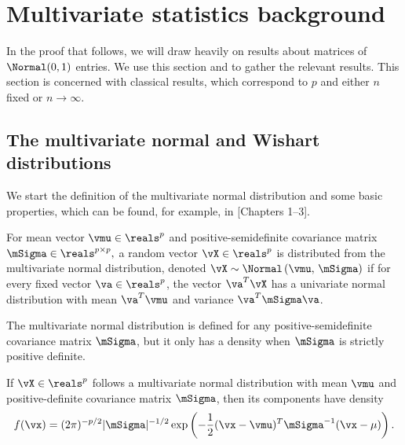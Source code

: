 
\chapter{Multivariate statistics background}

In the proof that follows, we will draw heavily on results about matrices of \iid $\Normal(0,1)$ entries. We use this section and to gather the relevant results. This section is concerned with classical results, which correspond to $p$ and either $n$ fixed or $n\to\infty$.

\section{The multivariate normal and Wishart distributions}

We start the definition of the multivariate normal distribution and some basic properties, which can be found, for example, in \cite{muirhead1982ams}[Chapters 1--3].

\begin{definition}
    \label{D:multivariate-normal}
For mean vector 
\(
    \vmu \in \reals^p
\)
and positive-semidefinite covariance matrix
\(
    \mSigma \in \reals^{p\times p},
\)
a random vector 
\(
    \vX \in \reals^p
\)
is distributed from the multivariate normal distribution, denoted 
\(
    \vX 
    \sim 
    \Normal \left(
        \vmu, \,
        \mSigma
    \right)
\)
if for every fixed vector $\va \in \reals^p$, the vector
$\va^T \vX$ has a univariate normal distribution with mean
\(
    \va^T \vmu
\)
and variance
\(
    \va^T \mSigma \va
\).
\end{definition}

\noindent
The multivariate normal distribution is defined for any positive-semidefinite covariance matrix $\mSigma$, but it only has a density when $\mSigma$ is strictly positive definite.

\begin{proposition}
If $\vX \in \reals^p$ follows a multivariate normal distribution with mean $\vmu$ and positive-definite covariance matrix $\mSigma$, then its components have density
\begin{equation}\label{E:normal-density}
    f( \vx )
    =
    (2 \pi )^{-p/2}
    |\mSigma|^{-1/2}
    \exp\left(
        -
        \frac{1}{2}
        (\vx - \vmu)^T
        \mSigma^{-1}
        (\vx - \mu)
    \right).
\end{equation}
\end{proposition}

